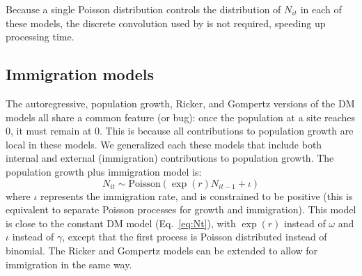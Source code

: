 \documentclass[12pt]{article}
\begin{document}
Because a single Poisson distribution controls the
distribution of $N_{it}$ in each of these models, the discrete
convolution used by \citet{dail_madsen:2011} is not required,
speeding up processing time.

\subsection{Immigration models}

The autoregressive, population growth, Ricker, and Gompertz
versions of the DM models all share a common feature (or bug):
once the population at a site reaches 0, it must remain at 0.
This is because all contributions to population growth are
local in these models.  We generalized each these models that
include both internal and external (immigration) contributions
to population growth.  The population growth plus immigration
model is:
\begin{equation}
  N_{it} \sim \text{Poisson}(\exp(r)N_{it-1} + \iota)
  \label{eq:expimm2}
\end{equation}
where $\iota$ represents the immigration rate, and is constrained to be
positive (this is equivalent to separate Poisson processes for growth and
immigration).  This model is close to
the constant DM model (Eq.~\ref{eq:Nt}), with $\exp(r)$ instead of $\omega$
and $\iota$ instead of $\gamma$, except that the first
process is Poisson distributed instead of binomial. The Ricker and
Gompertz models can be extended to allow for immigration in the same
way.

\end{document}
